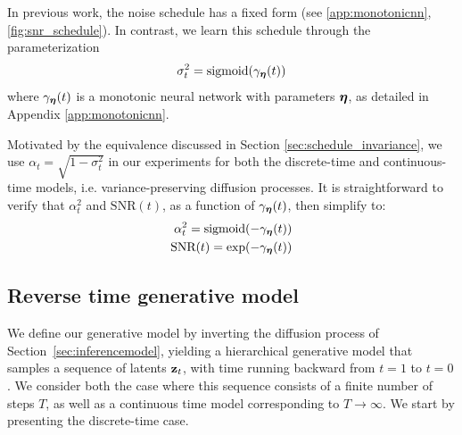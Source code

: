 \documentclass{article}
\newcommand{\snr}{\text{SNR}}
\begin{document}
In previous work, the noise schedule has a fixed form (see \cref{app:monotonicnn}, \cref{fig:snr_schedule}). In contrast, we learn this schedule through the parameterization
\begin{align}
\sigma^{2}_t = \text{sigmoid}(\gamma_{{\boldsymbol{\eta}}}(t))
\end{align}
where $\gamma_{{\boldsymbol{\eta}}}(t)$ is a monotonic neural network with parameters ${{\boldsymbol{\eta}}}$, as detailed in Appendix \ref{app:monotonicnn}.

Motivated by the equivalence discussed in Section \ref{sec:schedule_invariance}, we use $\alpha_t = \sqrt{1 - \sigma^2_t}$ in our experiments for both the discrete-time and continuous-time models, i.e. variance-preserving diffusion processes. It is straightforward to verify that $\alpha^2_t$ and $\snr(t)$, as a function of $\gamma_{{\boldsymbol{\eta}}}(t)$, then simplify to:
\begin{align}
\alpha^{2}_t = \text{sigmoid}(-\gamma_{\boldeta}(t)) \\
\snr(t) = \exp(-\gamma_{\boldeta}(t))
\end{align}
%

%

\subsection{Reverse time generative model}\label{sec:generativemodel}
We define our generative model by inverting the diffusion process of Section~\ref{sec:inferencemodel}, yielding a hierarchical generative model that samples a sequence of latents ${\mathbf{z}}_t$, with time running backward from $t=1$ to $t=0$.
We consider both the case where this sequence consists of a finite number of steps $T$, as well as a continuous time model corresponding to $T\rightarrow\infty$. We start by presenting the discrete-time case. 
\end{document}
